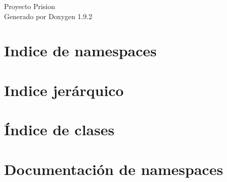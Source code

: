\documentclass[twoside]{book}
\newcommand{\+}{\discretionary{\mbox{\scriptsize$\hookleftarrow$}}{}{}}
\newcommand{\clearemptydoublepage}{%
    \newpage{\pagestyle{empty}\cleardoublepage}%
  }
\begin{document}
  \raggedbottom
    \hypersetup{pageanchor=false,
                bookmarksnumbered=true,
                pdfencoding=unicode
               }
  \begin{titlepage}
  \vspace*{7cm}
  \begin{center}%
  {\Large Proyecto Prision}\\
  \vspace*{1cm}
  {\large Generado por Doxygen 1.9.2}\\
  \end{center}
  \end{titlepage}
  \clearemptydoublepage
  \tableofcontents
  \clearemptydoublepage
  \hypersetup{pageanchor=true}
\chapter{Indice de namespaces}

\chapter{Indice jerárquico}

\chapter{Índice de clases}

\chapter{Documentación de namespaces}












\end{document}
